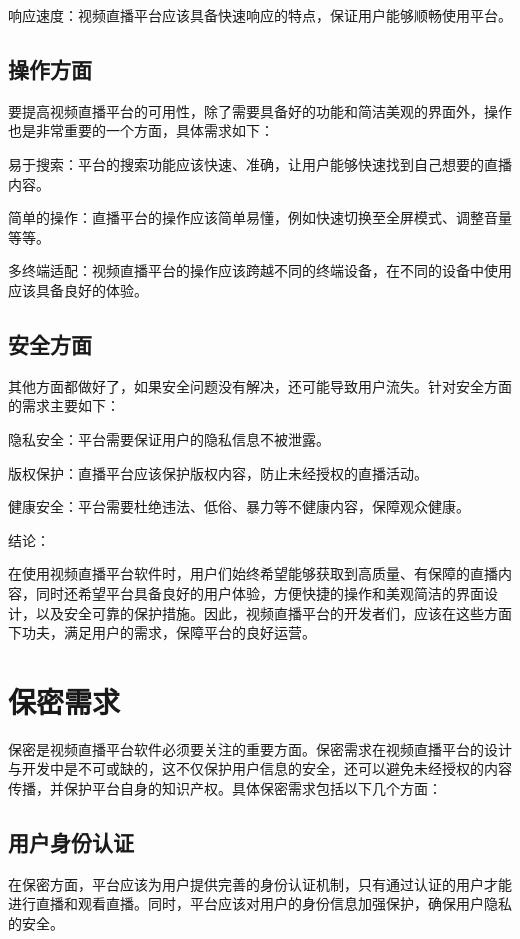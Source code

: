 响应速度：视频直播平台应该具备快速响应的特点，保证用户能够顺畅使用平台。

\subsection{操作方面}

要提高视频直播平台的可用性，除了需要具备好的功能和简洁美观的界面外，操作也是非常重要的一个方面，具体需求如下：

易于搜索：平台的搜索功能应该快速、准确，让用户能够快速找到自己想要的直播内容。

简单的操作：直播平台的操作应该简单易懂，例如快速切换至全屏模式、调整音量等等。

多终端适配：视频直播平台的操作应该跨越不同的终端设备，在不同的设备中使用应该具备良好的体验。

\subsection{安全方面}

其他方面都做好了，如果安全问题没有解决，还可能导致用户流失。针对安全方面的需求主要如下：

隐私安全：平台需要保证用户的隐私信息不被泄露。

版权保护：直播平台应该保护版权内容，防止未经授权的直播活动。

健康安全：平台需要杜绝违法、低俗、暴力等不健康内容，保障观众健康。

结论：

在使用视频直播平台软件时，用户们始终希望能够获取到高质量、有保障的直播内容，同时还希望平台具备良好的用户体验，方便快捷的操作和美观简洁的界面设计，以及安全可靠的保护措施。因此，视频直播平台的开发者们，应该在这些方面下功夫，满足用户的需求，保障平台的良好运营。

\section{保密需求}

保密是视频直播平台软件必须要关注的重要方面。保密需求在视频直播平台的设计与开发中是不可或缺的，这不仅保护用户信息的安全，还可以避免未经授权的内容传播，并保护平台自身的知识产权。具体保密需求包括以下几个方面：

\subsection{用户身份认证}

在保密方面，平台应该为用户提供完善的身份认证机制，只有通过认证的用户才能进行直播和观看直播。同时，平台应该对用户的身份信息加强保护，确保用户隐私的安全。

